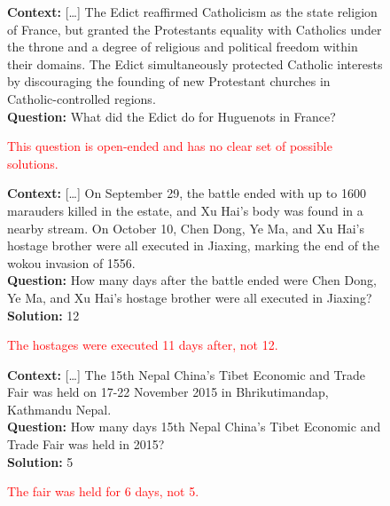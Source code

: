 \begin{figure}[h]
\centering

\begin{tcolorbox}[colback=gray!4, colframe=gray!50, arc=2mm, boxrule=0.5pt,left=9pt,right=9pt]
\small

\begin{tcolorbox}[colback=white, colframe=gray!50, arc=2mm, boxrule=0.5pt, title={Ambiguous question, \textit{SQuAD2.0}}, coltitle=black, colbacktitle=gray!10]
\textbf{Context:} [\ldots] The Edict reaffirmed Catholicism as the state religion of France, but granted the Protestants equality with Catholics under the throne and a degree of religious and political freedom within their domains. The Edict simultaneously protected Catholic interests by discouraging the founding of new Protestant churches in Catholic-controlled regions.\\
\textbf{Question:} What did the Edict do for Huguenots in France?
\end{tcolorbox}
\begin{adjustwidth}{1.4em}{0pt} \textcolor{red}{This question is open-ended and has no clear set of possible solutions.}
\end{adjustwidth}
\vspace{1em}

\begin{tcolorbox}[colback=white, colframe=gray!50, arc=2mm, boxrule=0.5pt, title={Mislabeled question, \textit{DROP}}, coltitle=black, colbacktitle=gray!10]
\textbf{Context:} [\ldots] On September 29, the battle ended with up to 1600 marauders killed in the estate, and Xu Hai's body was found in a nearby stream. On October 10, Chen Dong, Ye Ma, and Xu Hai's hostage brother were all executed in Jiaxing, marking the end of the wokou invasion of 1556.\\
\textbf{Question:} How many days after the battle ended were Chen Dong, Ye Ma, and Xu Hai's hostage brother were all executed in Jiaxing?\\
\textbf{Solution:} 12
\end{tcolorbox}
\begin{adjustwidth}{1.4em}{0pt} \textcolor{red}{The hostages were executed 11 days after, not 12.}
\end{adjustwidth}
\vspace{1em}

\begin{tcolorbox}[colback=white, colframe=gray!50, arc=2mm, boxrule=0.5pt, title={Mislabeled question, \textit{DROP}}, coltitle=black, colbacktitle=gray!10]
\textbf{Context:} [\ldots] The 15th Nepal China’s Tibet Economic and Trade Fair was held on 17-22 November 2015 in Bhrikutimandap, Kathmandu Nepal.\\
\textbf{Question:} How many days 15th Nepal China’s Tibet Economic and Trade Fair was held in 2015?\\
\textbf{Solution:} 5
\end{tcolorbox}
\begin{adjustwidth}{1.4em}{0pt} \textcolor{red}{The fair was held for 6 days, not 5.}
\end{adjustwidth}
\vspace{1em}


\end{tcolorbox}
\end{figure}
